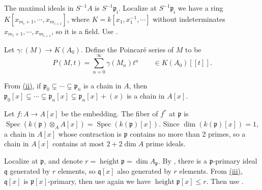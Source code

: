 \begin{exercise}\label{ex11.4}
	The maximal ideals in $S^{-1}A$ is $S^{-1}\mathfrak{p_i}$. Localize at $S^{-1}\mathfrak{p_i}$ we have a ring $K\left[x_{m_i+1},\cdots,x_{m_{i+1}}\right]$, where $K=k\left[x_1,x_1^{-1},\cdots\right]$ without indeterminates $x_{m_i+1},\cdots,x_{m_{i+1}}$, so it is a field. Use .
\end{exercise}

\begin{exercise}\label{ex11.5}
	Let $\gamma:(M)\rightarrow K\left(A_0\right)$. Define the Poincar\'e series of $M$ to be 
	\begin{equation*}
		P(M,t)=\sum_{n=0}^\infty\gamma\left(M_n\right)t^n\qquad\in K\left(A_0\right)[[t]].
	\end{equation*}
\end{exercise}

\begin{exercise}\label{ex11.6}
	From \hyperref[ex4.7]{(ii)}, if $\mathfrak{p}_0\subsetneq\cdots\subsetneq\mathfrak{p}_n$ is a chain in $A$, then $\mathfrak{p}_0[x]\subsetneq\cdots\subsetneq\mathfrak{p}_n[x]\subsetneq\mathfrak{p}_n[x]+(x)$ is a chain in $A[x]$.
	
	Let $f:A\rightarrow A[x]$ be the embedding. The fiber of $f^*$ at $\mathfrak{p}$ is $\operatorname{Spec}\left(k(\mathfrak{p})\otimes_AA[x]\right)=\operatorname{Spec}(k(\mathfrak{p})[x])$. Since $\dim\left(k(\mathfrak{p})[x]\right)=1$, a chain in $A[x]$ whose contraction is $\mathfrak{p}$ contains no more than 2 primes, so a chain in $A[x]$ contains at most $2+2\dim A$ prime ideals.
\end{exercise}

\begin{exercise}\label{ex11.7}
	Localize at $\mathfrak{p}$, and denote $r=\operatorname{height}\mathfrak{p}=\dim A_\mathfrak{p}$. By , there is a $\mathfrak{p}$-primary ideal $\mathfrak{q}$ generated by $r$ elements, so $\mathfrak{q}[x]$ also generated by $r$ elements. From \hyperref[ex4.7]{(iii)}, $\mathfrak{q}[x]$ is $\mathfrak{p}[x]$-primary, then use  again we have $\operatorname{height}\mathfrak{p}[x]\leqslant r$. Then use .
\end{exercise}